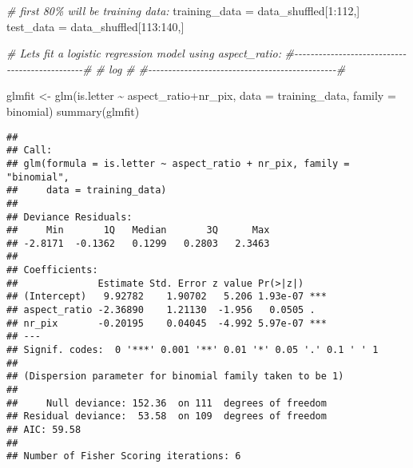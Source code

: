 \documentclass[
]{article}
\newenvironment{Shaded}{\begin{snugshade}}{\end{snugshade}}
\newcommand{\AttributeTok}[1]{\textcolor[rgb]{0.77,0.63,0.00}{#1}}
\newcommand{\CommentTok}[1]{\textcolor[rgb]{0.56,0.35,0.01}{\textit{#1}}}
\newcommand{\DecValTok}[1]{\textcolor[rgb]{0.00,0.00,0.81}{#1}}
\newcommand{\FunctionTok}[1]{\textcolor[rgb]{0.00,0.00,0.00}{#1}}
\newcommand{\NormalTok}[1]{#1}
\newcommand{\OtherTok}[1]{\textcolor[rgb]{0.56,0.35,0.01}{#1}}
\newcommand{\SpecialCharTok}[1]{\textcolor[rgb]{0.00,0.00,0.00}{#1}}
\newcommand{\StringTok}[1]{\textcolor[rgb]{0.31,0.60,0.02}{#1}}
\begin{document}
\begin{Shaded}
\begin{Highlighting}[]
\CommentTok{\# first 80\% will be training data:}
\NormalTok{training\_data }\OtherTok{=}\NormalTok{ data\_shuffled[}\DecValTok{1}\SpecialCharTok{:}\DecValTok{112}\NormalTok{,]}
\NormalTok{test\_data }\OtherTok{=}\NormalTok{ data\_shuffled[}\DecValTok{113}\SpecialCharTok{:}\DecValTok{140}\NormalTok{,]}



\CommentTok{\# Lets fit a logistic regression model using aspect\_ratio:}
\CommentTok{\#{-}{-}{-}{-}{-}{-}{-}{-}{-}{-}{-}{-}{-}{-}{-}{-}{-}{-}{-}{-}{-}{-}{-}{-}{-}{-}{-}{-}{-}{-}{-}{-}{-}{-}{-}{-}{-}{-}{-}{-}{-}{-}{-}{-}{-}{-}{-}\#}
\CommentTok{\#            log                                \#}
\CommentTok{\#{-}{-}{-}{-}{-}{-}{-}{-}{-}{-}{-}{-}{-}{-}{-}{-}{-}{-}{-}{-}{-}{-}{-}{-}{-}{-}{-}{-}{-}{-}{-}{-}{-}{-}{-}{-}{-}{-}{-}{-}{-}{-}{-}{-}{-}{-}{-}\#}

\NormalTok{glmfit }\OtherTok{\textless{}{-}} \FunctionTok{glm}\NormalTok{(is.letter }\SpecialCharTok{\textasciitilde{}}\NormalTok{ aspect\_ratio}\SpecialCharTok{+}\NormalTok{nr\_pix, }\AttributeTok{data =}\NormalTok{ training\_data, }\AttributeTok{family =} \StringTok{\textquotesingle{}binomial\textquotesingle{}}\NormalTok{) }
\FunctionTok{summary}\NormalTok{(glmfit)}
\end{Highlighting}
\end{Shaded}

\begin{verbatim}
## 
## Call:
## glm(formula = is.letter ~ aspect_ratio + nr_pix, family = "binomial", 
##     data = training_data)
## 
## Deviance Residuals: 
##     Min       1Q   Median       3Q      Max  
## -2.8171  -0.1362   0.1299   0.2803   2.3463  
## 
## Coefficients:
##              Estimate Std. Error z value Pr(>|z|)    
## (Intercept)   9.92782    1.90702   5.206 1.93e-07 ***
## aspect_ratio -2.36890    1.21130  -1.956   0.0505 .  
## nr_pix       -0.20195    0.04045  -4.992 5.97e-07 ***
## ---
## Signif. codes:  0 '***' 0.001 '**' 0.01 '*' 0.05 '.' 0.1 ' ' 1
## 
## (Dispersion parameter for binomial family taken to be 1)
## 
##     Null deviance: 152.36  on 111  degrees of freedom
## Residual deviance:  53.58  on 109  degrees of freedom
## AIC: 59.58
## 
## Number of Fisher Scoring iterations: 6
\end{verbatim}
\end{document}
